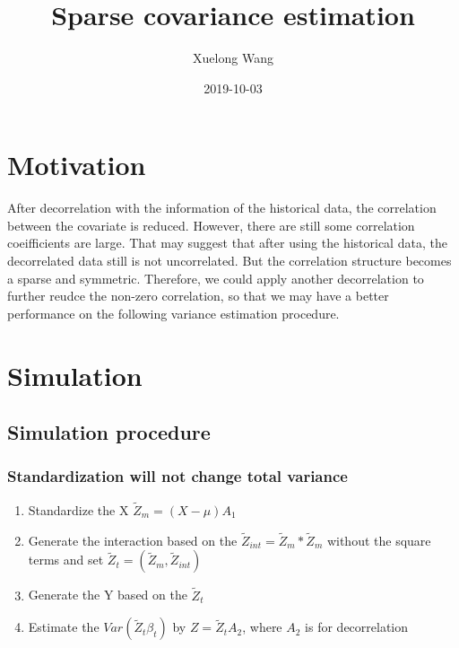 \documentclass[]{article}
\title{Sparse covariance estimation}
\author{Xuelong Wang}
\date{2019-10-03}
\providecommand{\tightlist}{%
  \setlength{\itemsep}{0pt}\setlength{\parskip}{0pt}}
\begin{document}
\maketitle

{
\setcounter{tocdepth}{2}
\tableofcontents
}
\section{Motivation}\label{motivation}

After decorrelation with the information of the historical data, the
correlation between the covariate is reduced. However, there are still
some correlation coeifficients are large. That may suggest that after
using the historical data, the decorrelated data still is not
uncorrelated. But the correlation structure becomes a sparse and
symmetric. Therefore, we could apply another decorrelation to further
reudce the non-zero correlation, so that we may have a better
performance on the following variance estimation procedure.

\section{Simulation}\label{simulation}

\subsection{Simulation procedure}\label{simulation-procedure}

\subsubsection{Standardization will not change total
variance}\label{standardization-will-not-change-total-variance}

\begin{enumerate}
\def\labelenumi{\arabic{enumi}.}
\tightlist
\item
  Standardize the X \(\tilde{Z}_m = (X-\mu)A_1\)
\item
  Generate the interaction based on the
  \(\tilde{Z}_{int} = \tilde{Z}_m*\tilde{Z}_m\) without the square terms
  and set \(\tilde{Z}_t = (\tilde{Z}_m, \tilde{Z}_{int})\)
\item
  Generate the Y based on the \(\tilde{Z}_t\)
\item
  Estimate the \(Var(\tilde{Z}_t \beta_t)\) by \(Z = \tilde{Z}_tA_2\),
  where \(A_2\) is for decorrelation
\end{enumerate}
\end{document}
